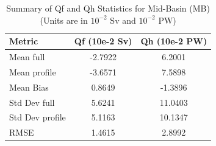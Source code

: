 \begin{table}[h!]
\centering
\caption{Summary of Qf and Qh Statistics for Mid-Basin (MB) (Units are in $10^{-2}$ Sv and $10^{-2}$ PW)}
\label{tab:stats_summary_Mid-Basin (MB)}
\begin{tabular}{|l|c|c|}
\hline
Metric & Qf (10e-2 Sv) & Qh (10e-2 PW) \\
\hline
\hline
Mean full & -2.7922 & 6.2001 \\
Mean profile & -3.6571 & 7.5898 \\
Mean Bias & 0.8649 & -1.3896 \\
\hline
Std Dev full & 5.6241 & 11.0403 \\
Std Dev profile & 5.1163 & 10.1347 \\
RMSE & 1.4615 & 2.8992 \\
\hline
\end{tabular}
\end{table}
